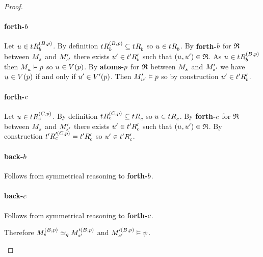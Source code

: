 \begin{proof}
\begin{description}
        \paragraph{forth-$\agentB$}
        Let $\kStateU \in \kSuccessorsB[(\agentsB, \atomP)]{\kStateT}$.
        By definition $\kSuccessorsB[(\agentsB, \atomP)]{\kStateT} \subseteq \kSuccessorsB{\kStateT}$ so $\kStateU \in \kSuccessorsB{\kStateT}$.
        By {\bf forth-$\agentB$} for $\bisimulation$ between $\kPModel{\kStateS}$ and $\kPModelP{\kStateSP}$ there exists $\kStateUP \in \kSuccessorsPB{\kStateTP}$ such that $(\kStateU, \kStateUP) \in \bisimulation$.
        As $\kStateU \in \kSuccessorsB[(\agentsB, \atomP)]{\kStateT}$ then $\kPModel{\kStateU} \entails \atomP$ so $\kStateU \in \kValuation(\atomP)$.
        By {\bf atoms-$\atomP$} for $\bisimulation$ between $\kPModel{\kStateS}$ and $\kPModelP{\kStateSP}$ we have $\kStateU \in \kValuation(\atomP)$ if and only if $\kStateUP \in \kValuationP(\atomP)$.
        Then $\kPModelP{\kStateUP} \entails \atomP$ so by construction $\kStateUP \in \kSuccessorsPB{\kStateTP}$.

        \paragraph{forth-$\agentC$}
        Let $\kStateU \in \kSuccessorsC[(\agentsC, \atomP)]{\kStateT}$.
        By definition $\kSuccessorsC[(\agentsC, \atomP)]{\kStateT} \subseteq \kSuccessorsC{\kStateT}$ so $\kStateU \in \kSuccessorsC{\kStateT}$.
        By {\bf forth-$\agentC$} for $\bisimulation$ between $\kPModel{\kStateS}$ and $\kPModelP{\kStateSP}$ there exists $\kStateUP \in \kSuccessorsPC{\kStateTP}$ such that $(\kStateU, \kStateUP) \in \bisimulation$.
        By construction $\kSuccessorsC[\prime(\agentsC, \atomP)]{\kStateTP} = \kSuccessorsPC{\kStateTP}$ so $\kStateUP \in \kSuccessorsPC{\kStateTP}$.

        \paragraph{back-$\agentB$}
        Follows from symmetrical reasoning to {\bf forth-$\agentB$}.

        \paragraph{back-$\agentC$}
        Follows from symmetrical reasoning to {\bf forth-$\agentC$}.

        Therefore $\kPModel[(\agentsB, \atomP)]{\kStateS} \bisimilar[\atomQ] \kPModel[\prime(\agentsB, \atomP)]{\kStateSP}$ and $\kPModel[\prime(\agentsB, \atomP)]{\kStateSP} \entails \psi$.


\end{description}
\end{proof}
